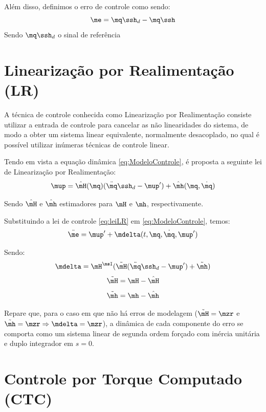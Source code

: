 \documentclass[]{politex}
\begin{document}
Além disso, definimos o erro de controle como sendo:
\begin{equation}
\me = \mq\ssh_d - \mq\ssh
\end{equation}
Sendo $\mq\ssh_d$ o sinal de referência

\section{Linearização por Realimentação (LR)}

A técnica de controle conhecida como Linearização por Realimentação consiste utilizar a entrada de controle para cancelar as não linearidades do sistema, de modo a obter um sistema linear equivalente, normalmente desacoplado, no qual é possível utilizar inúmeras técnicas de controle linear.

Tendo em vista a equação dinâmica \eqref{eq:ModeloControle}, é proposta a seguinte lei de Linearização por Realimentação:
\begin{equation} \label{eq:leiLR}
\mup = \hat{\mH}(\mq) (\ddot{\mq}\ssh_d - \mup' ) + \hat{\mh}(\mq,\dot{\mq})
\end{equation}

Sendo $\hat{\mH}$ e $\hat{\mh}$ estimadores para $\mH$ e $\mh$, respectivamente.

Substituindo a lei de controle \eqref{eq:leiLR} em \eqref{eq:ModeloControle}, temos:
\begin{equation} \label{eq:ModeloLin}
\ddot{\me}  = \mup' + \mdelta(t,\mq,\dot{\mq}, \mup')
\end{equation}

Sendo:
\begin{equation}
\mdelta = \mH^\msI( \tilde{\mH}(\ddot{\mq}\ssh_d - \mup') + \tilde{\mh} )
\end{equation}
\begin{equation} \label{eq:Htil}
\tilde{\mH} = \mH - \hat{\mH}
\end{equation} 
\begin{equation} \label{eq:htil}
\tilde{\mh} = \mh - \hat{\mh}
\end{equation}

Repare que, para o caso em que não há erros de modelagem ($\tilde{\mH} = \mzr$ e $\tilde{\mh} = \mzr \Rightarrow \mdelta = \mzr$), a dinâmica de cada componente do erro se comporta como um sistema linear de segunda ordem forçado com inércia unitária e duplo integrador em $s = 0$.

\section{Controle por Torque Computado (CTC)} \label{sec:CTC}
\end{document}
